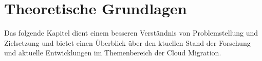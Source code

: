 
\chapter{Theoretische Grundlagen}

Das folgende Kapitel dient einem besseren Verständnis von Problemstellung und Zielsetzung und bietet einen Überblick über den 
ktuellen Stand der Forschung und aktuelle Entwicklungen im Themenbereich der Cloud Migration.


\pagebreak






